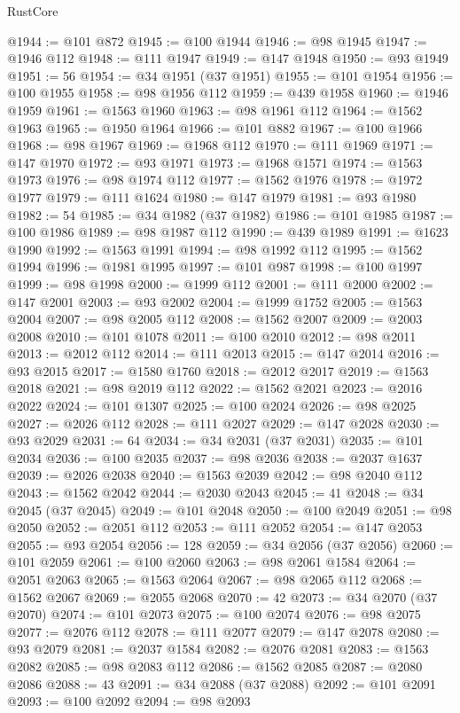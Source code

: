 \begin{lexlean}{RustCore}
\begin{coremodule}
@1944 := @101 @872
@1945 := @100 @1944
@1946 := @98 @1945
@1947 := @1946 @112
@1948 := @111 @1947
@1949 := @147 @1948
@1950 := @93 @1949
@1951 := 56
@1954 := @34 @1951 (@37 @1951)
@1955 := @101 @1954
@1956 := @100 @1955
@1958 := @98 @1956 @112
@1959 := @439 @1958
@1960 := @1946 @1959
@1961 := @1563 @1960
@1963 := @98 @1961 @112
@1964 := @1562 @1963
@1965 := @1950 @1964
@1966 := @101 @882
@1967 := @100 @1966
@1968 := @98 @1967
@1969 := @1968 @112
@1970 := @111 @1969
@1971 := @147 @1970
@1972 := @93 @1971
@1973 := @1968 @1571
@1974 := @1563 @1973
@1976 := @98 @1974 @112
@1977 := @1562 @1976
@1978 := @1972 @1977
@1979 := @111 @1624
@1980 := @147 @1979
@1981 := @93 @1980
@1982 := 54
@1985 := @34 @1982 (@37 @1982)
@1986 := @101 @1985
@1987 := @100 @1986
@1989 := @98 @1987 @112
@1990 := @439 @1989
@1991 := @1623 @1990
@1992 := @1563 @1991
@1994 := @98 @1992 @112
@1995 := @1562 @1994
@1996 := @1981 @1995
@1997 := @101 @987
@1998 := @100 @1997
@1999 := @98 @1998
@2000 := @1999 @112
@2001 := @111 @2000
@2002 := @147 @2001
@2003 := @93 @2002
@2004 := @1999 @1752
@2005 := @1563 @2004
@2007 := @98 @2005 @112
@2008 := @1562 @2007
@2009 := @2003 @2008
@2010 := @101 @1078
@2011 := @100 @2010
@2012 := @98 @2011
@2013 := @2012 @112
@2014 := @111 @2013
@2015 := @147 @2014
@2016 := @93 @2015
@2017 := @1580 @1760
@2018 := @2012 @2017
@2019 := @1563 @2018
@2021 := @98 @2019 @112
@2022 := @1562 @2021
@2023 := @2016 @2022
@2024 := @101 @1307
@2025 := @100 @2024
@2026 := @98 @2025
@2027 := @2026 @112
@2028 := @111 @2027
@2029 := @147 @2028
@2030 := @93 @2029
@2031 := 64
@2034 := @34 @2031 (@37 @2031)
@2035 := @101 @2034
@2036 := @100 @2035
@2037 := @98 @2036
@2038 := @2037 @1637
@2039 := @2026 @2038
@2040 := @1563 @2039
@2042 := @98 @2040 @112
@2043 := @1562 @2042
@2044 := @2030 @2043
@2045 := 41
@2048 := @34 @2045 (@37 @2045)
@2049 := @101 @2048
@2050 := @100 @2049
@2051 := @98 @2050
@2052 := @2051 @112
@2053 := @111 @2052
@2054 := @147 @2053
@2055 := @93 @2054
@2056 := 128
@2059 := @34 @2056 (@37 @2056)
@2060 := @101 @2059
@2061 := @100 @2060
@2063 := @98 @2061 @1584
@2064 := @2051 @2063
@2065 := @1563 @2064
@2067 := @98 @2065 @112
@2068 := @1562 @2067
@2069 := @2055 @2068
@2070 := 42
@2073 := @34 @2070 (@37 @2070)
@2074 := @101 @2073
@2075 := @100 @2074
@2076 := @98 @2075
@2077 := @2076 @112
@2078 := @111 @2077
@2079 := @147 @2078
@2080 := @93 @2079
@2081 := @2037 @1584
@2082 := @2076 @2081
@2083 := @1563 @2082
@2085 := @98 @2083 @112
@2086 := @1562 @2085
@2087 := @2080 @2086
@2088 := 43
@2091 := @34 @2088 (@37 @2088)
@2092 := @101 @2091
@2093 := @100 @2092
@2094 := @98 @2093

\end{coremodule}
\end{lexlean}
